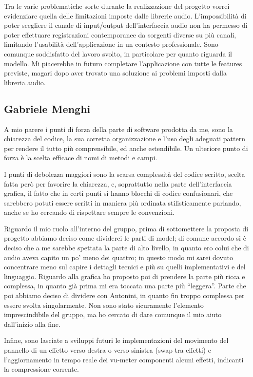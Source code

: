 \documentclass[a4paper,12pt]{report}
\begin{document}
Tra le varie problematiche sorte durante la realizzazione del progetto vorrei evidenziare quella delle limitazioni imposte dalle librerie audio. L’impossibilità di poter scegliere il canale di input/output dell’interfaccia audio non ha permesso di poter effettuare registrazioni contemporanee da sorgenti diverse su più canali, limitando l’usabilità dell’applicazione in un contesto professionale.
Sono comunque soddisfatto del lavoro svolto, in particolare per quanto riguarda il modello. 
Mi piacerebbe in futuro completare l’applicazione con tutte le features previste, magari dopo aver trovato una soluzione ai problemi imposti dalla libreria audio.

\subsection{Gabriele Menghi}
A mio parere i punti di forza della parte di software prodotta da me, sono la chiarezza del codice, la sua corretta organizzazione e l’uso degli adeguati pattern per rendere il tutto più comprensibile, ed anche estendibile. Un ulteriore punto di forza è la scelta efficace di nomi di metodi e campi. 

I punti di debolezza maggiori sono la scarsa complessità del codice scritto, scelta fatta però per favorire la chiarezza, e, soprattutto nella parte dell’interfaccia grafica, il fatto che in certi punti si hanno blocchi di codice confusionari, che sarebbero potuti essere scritti in maniera più ordinata stilisticamente parlando, anche se ho cercando di rispettare sempre le convenzioni.

Riguardo il mio ruolo all’interno del gruppo, prima di sottomettere la proposta di progetto abbiamo deciso come dividerci le parti di model; di comune accordo si è deciso che a me sarebbe spettata la parte di alto livello, in quanto ero colui che di audio aveva capito un po' meno dei quattro; in questo modo mi sarei dovuto concentrare meno sul capire i dettagli tecnici e più su quelli implementativi e del linguaggio. Riguardo alla grafica ho proposto poi di prendere la parte più ricca e complessa, in quanto già prima mi era toccata una parte più “leggera”. Parte che poi abbiamo deciso di dividere con Antonini, in quanto fin troppo complessa per essere svolta singolarmente. Non sono stato sicuramente l’elemento imprescindibile del gruppo, ma ho cercato di dare comunque il mio aiuto dall’inizio alla fine.

Infine, sono lasciate a sviluppi futuri le implementazioni del movimento del pannello di un effetto verso destra o verso sinistra (swap tra effetti) e l’aggiornamento in tempo reale dei vu-meter componenti alcuni effetti, indicanti la compressione corrente.
\end{document}
